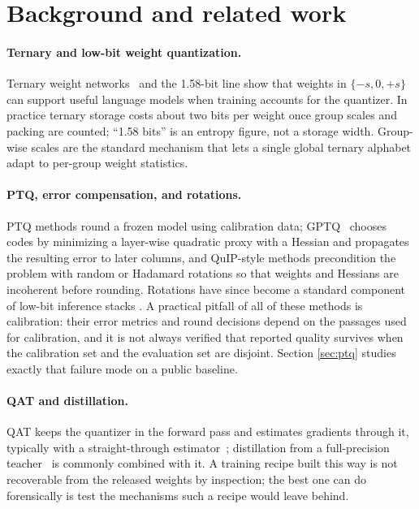 \section{Background and related work}
\label{sec:background}

\paragraph{Ternary and low-bit weight quantization.}
Ternary weight networks~\citep{twn} and the 1.58-bit line
\citep{bitnet158} show that weights in $\{-s, 0, +s\}$ can support useful
language models when training accounts for the quantizer. In practice ternary
storage costs about two bits per weight once group scales and packing are
counted; ``1.58 bits'' is an entropy figure, not a storage width. Group-wise
scales are the standard mechanism that lets a single global ternary alphabet
adapt to per-group weight statistics.

\paragraph{PTQ, error compensation, and rotations.}
PTQ methods round a frozen model using calibration data; GPTQ~\citep{gptq}
chooses codes by minimizing a layer-wise quadratic proxy with a Hessian and
propagates the resulting error to later columns, and QuIP-style methods
\citep{quip,quipsharp} precondition the problem with random or Hadamard
rotations so that weights and Hessians are incoherent before rounding.
Rotations have since become a standard component of low-bit inference stacks
\citep{quarot,spinquant}. A practical pitfall of all of these methods is
calibration: their error metrics and round decisions depend on the passages
used for calibration, and it is not always verified that reported quality
survives when the calibration set and the evaluation set are disjoint. Section
\ref{sec:ptq} studies exactly that failure mode on a public baseline.

\paragraph{QAT and distillation.}
QAT keeps the quantizer in the forward pass and estimates gradients through it,
typically with a straight-through estimator~\citep{ste}; distillation from a
full-precision teacher~\citep{kd} is commonly combined with it. A training
recipe built this way is not recoverable from the released weights by
inspection; the best one can do forensically is test the mechanisms such a
recipe would leave behind.


